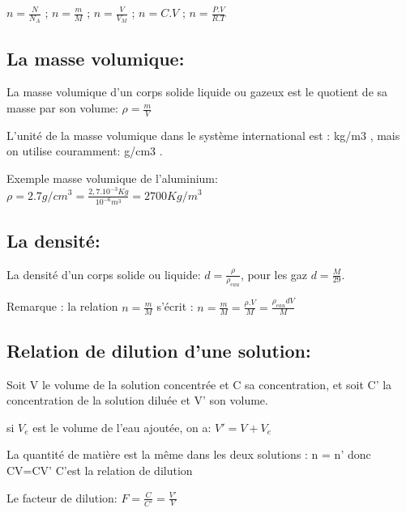 \documentclass[12pt]{article}
\begin{document}
$n = \frac{N}{N_A}$ ; $n = \frac{m}{M}$ ; $n = \frac{V}{V_M}$ ; $n = C.V$ ; $n = \frac{P.V}{R.T}$ 

\subsection{La masse volumique:}
La masse volumique d'un corps solide liquide ou gazeux est le quotient de sa masse par son volume: $\rho = \frac{m}{V}$

L'unité de la masse volumique dans le système international est : kg/m3 , mais on utilise couramment: g/cm3
.

Exemple masse volumique de l'aluminium: $\rho = 2.7g/cm^3 = \frac{2,7.10^{-3}Kg}{10^{-6}m^3} = 2700 Kg/m^3$

\subsection{ La densité:}
La densité d'un corps solide ou liquide: $d = \frac{\rho}{\rho_{eau}}$, pour les gaz $d = \frac{M}{29}.$

Remarque : la relation $n=\frac{m}{M}$ s'écrit : $n = \frac{m}{M} = \frac{\rho.V}{M} = \frac{\rho_{eau}dV}{M}$

\subsection{Relation de dilution d'une solution: }
Soit V le volume de la solution concentrée et C sa concentration, et soit C' la concentration de la solution diluée et V' son volume.

si $V_e$ est le volume de l'eau ajoutée, on a: $V' = V+V_{e}$

La quantité de matière est la même dans les deux solutions : n = n' donc CV=CV'  C'est la relation de dilution

Le facteur de dilution: $F= \frac{C}{C'} = \frac{V'}{V}$
\end{document}
